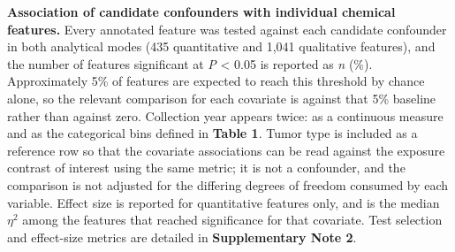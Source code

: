 \textbf{Association of candidate confounders with individual chemical features.} Every annotated feature was tested against each candidate confounder in both analytical modes (435 quantitative and 1,041 qualitative features), and the number of features significant at \textit{P} < 0.05 is reported as \textit{n} (\%). Approximately 5\% of features are expected to reach this threshold by chance alone, so the relevant comparison for each covariate is against that 5\% baseline rather than against zero. Collection year appears twice: as a continuous measure and as the categorical bins defined in \textbf{Table 1}. Tumor type is included as a reference row so that the covariate associations can be read against the exposure contrast of interest using the same metric; it is not a confounder, and the comparison is not adjusted for the differing degrees of freedom consumed by each variable. Effect size is reported for quantitative features only, and is the median $\eta^{2}$ among the features that reached significance for that covariate. Test selection and effect-size metrics are detailed in \textbf{Supplementary Note 2}.
